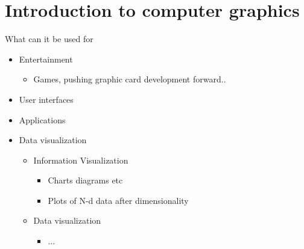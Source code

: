 
\section{Introduction to computer graphics}
What can it be used for

\begin{itemize}
	\item Entertainment
	\begin{itemize}
		\item Games, pushing graphic card development forward.. 
	\end{itemize}
	\item User interfaces
	\item Applications
	\item Data visualization
	\begin{itemize}
		\item Information Visualization
		\begin{itemize}
			\item Charts diagrams etc
			\item Plots of N-d data after dimensionality
		\end{itemize}
		\item Data visualization
		\begin{itemize}
			\item ... 
		\end{itemize}


\end{itemize}
\end{itemize}
